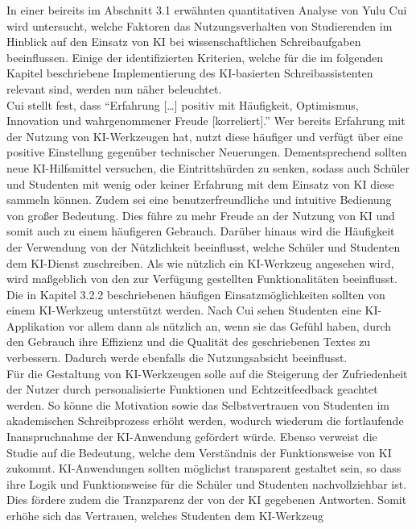 \documentclass[../main.tex]{subfiles}
\begin{document}
In einer beireits im Abschnitt 3.1 erwähnten quantitativen Analyse von Yulu Cui wird untersucht, welche Faktoren das Nutzungsverhalten von Studierenden im Hinblick auf den 
Einsatz von KI bei wissenschaftlichen Schreibaufgaben beeinflussen.\cite{influencingUsingAi} Einige der identifizierten Kriterien, welche für die im folgenden Kapitel 
beschriebene Implementierung des KI-basierten Schreibassistenten relevant sind, werden nun näher beleuchtet. \\ 
Cui stellt fest, dass "`Erfahrung […] positiv mit Häufigkeit, Optimismus, Innovation und wahrgenommener Freude [korreliert]."'\cite[6]{influencingUsingAi} Wer bereits 
Erfahrung mit der Nutzung von KI-Werkzeugen hat, nutzt diese häufiger und verfügt über eine positive Einstellung gegenüber technischer Neuerungen. Dementsprechend 
sollten neue KI-Hilfsmittel versuchen, die Eintrittshürden zu senken, sodass auch Schüler und Studenten mit wenig oder keiner Erfahrung mit dem Einsatz von KI diese 
sammeln können. Zudem sei eine benutzerfreundliche und intuitive Bedienung von großer Bedeutung\cite[6]{influencingUsingAi}. Dies führe zu mehr Freude an der Nutzung 
von KI und somit auch zu einem häufigeren Gebrauch. Darüber hinaus wird die Häufigkeit der Verwendung von der Nützlichkeit beeinflusst, welche Schüler und Studenten 
dem KI-Dienst zuschreiben. Als wie nützlich ein KI-Werkzeug angesehen wird, wird maßgeblich von den zur Verfügung gestellten Funktionalitäten beeinflusst. Die in 
Kapitel 3.2.2 beschriebenen häufigen Einsatzmöglichkeiten sollten von einem KI-Werkzeug unterstützt werden. Nach Cui sehen Studenten eine KI-Applikation vor allem dann 
als nützlich an, wenn sie das Gefühl haben, durch den Gebrauch ihre Effizienz und die Qualität des geschriebenen Textes zu verbessern. Dadurch werde ebenfalls die 
Nutzungsabsicht beeinflusst\cite[7]{influencingUsingAi}. \\
Für die Gestaltung von KI-Werkzeugen solle auf die Steigerung der Zufriedenheit der Nutzer durch personalisierte Funktionen und Echtzeitfeedback geachtet 
werden\cite[10]{influencingUsingAi}. So könne die Motivation sowie das Selbstvertrauen von Studenten im akademischen Schreibprozess erhöht werden, wodurch 
wiederum die fortlaufende Inanspruchnahme der KI-Anwendung gefördert würde\cite[10]{influencingUsingAi}. Ebenso verweist die Studie auf die Bedeutung, welche dem 
Verständnis der Funktionsweise von KI zukommt. KI-Anwendungen sollten möglichst transparent gestaltet sein, so dass ihre Logik und Funktionsweise für die Schüler und 
Studenten nachvollziehbar ist. Dies fördere zudem die Tranzparenz der von der KI gegebenen Antworten. Somit erhöhe sich das Vertrauen, welches Studenten dem KI-Werkzeug 
\end{document}
